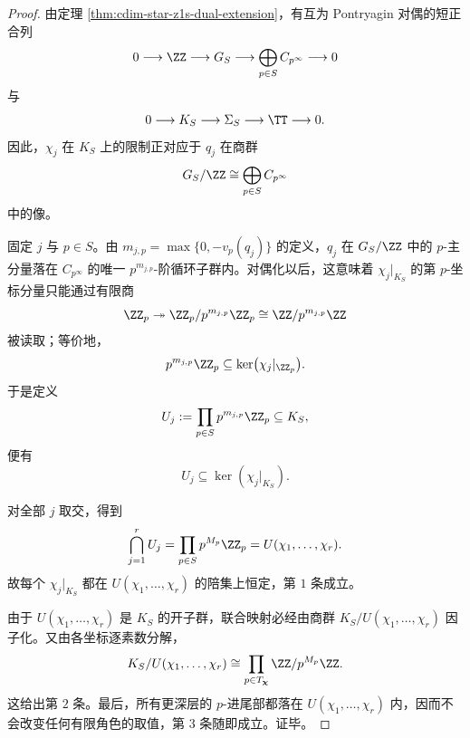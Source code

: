 \begin{proof}
由定理 \ref{thm:cdim-star-z1s-dual-extension}，有互为 Pontryagin 对偶的短正合列
\[
0\longrightarrow \ZZ
\longrightarrow G_S
\longrightarrow \bigoplus_{p\in S}C_{p^\infty}
\longrightarrow 0
\]
与
\[
0\longrightarrow K_S
\longrightarrow \Sigma_S
\longrightarrow \TT
\longrightarrow 0.
\]
因此，\(\chi_j\) 在 \(K_S\) 上的限制正对应于 \(q_j\) 在商群
\[
G_S/\ZZ\cong \bigoplus_{p\in S}C_{p^\infty}
\]
中的像。

固定 \(j\) 与 \(p\in S\)。由 \(m_{j,p}=\max\{0,-v_p(q_j)\}\) 的定义，\(q_j\) 在 \(G_S/\ZZ\) 中的 \(p\)-主分量落在 \(C_{p^\infty}\) 的唯一 \(p^{m_{j,p}}\)-阶循环子群内。对偶化以后，这意味着 \(\chi_j|_{K_S}\) 的第 \(p\)-坐标分量只能通过有限商
\[
\ZZ_p\twoheadrightarrow \ZZ_p/p^{m_{j,p}}\ZZ_p\cong \ZZ/p^{m_{j,p}}\ZZ
\]
被读取；等价地，
\[
p^{m_{j,p}}\ZZ_p
\subseteq
\ker\bigl(\chi_j|_{\ZZ_p}\bigr).
\]
于是定义
\[
U_j:=\prod_{p\in S}p^{m_{j,p}}\ZZ_p\subseteq K_S,
\]
便有
\[
U_j\subseteq \ker(\chi_j|_{K_S}).
\]

对全部 \(j\) 取交，得到
\[
\bigcap_{j=1}^{r}U_j
=
\prod_{p\in S}p^{M_p}\ZZ_p
=
U(\chi_1,\dots,\chi_r).
\]
故每个 \(\chi_j|_{K_S}\) 都在 \(U(\chi_1,\dots,\chi_r)\) 的陪集上恒定，第 \(1\) 条成立。

由于 \(U(\chi_1,\dots,\chi_r)\) 是 \(K_S\) 的开子群，联合映射必经由商群 \(K_S/U(\chi_1,\dots,\chi_r)\) 因子化。又由各坐标逐素数分解，
\[
K_S/U(\chi_1,\dots,\chi_r)
\cong
\prod_{p\in T_{\boldsymbol{\chi}}}\ZZ/p^{M_p}\ZZ.
\]
这给出第 \(2\) 条。最后，所有更深层的 \(p\)-进尾部都落在 \(U(\chi_1,\dots,\chi_r)\) 内，因而不会改变任何有限角色的取值，第 \(3\) 条随即成立。证毕。
\end{proof}

